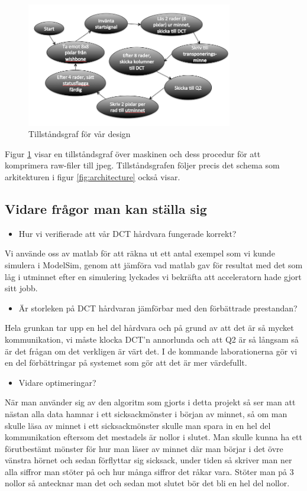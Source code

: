 \documentclass[a4paper]{article}
\begin{document}
\begin{figure}[h]
\centering
\includegraphics[width=340px]{states.png}
\caption{Tillståndsgraf för vår design}
\label{fig:state}
\end{figure}
Figur \ref{fig:state} visar en tillståndsgraf över maskinen och dess procedur för att komprimera raw-filer till jpeg. Tillståndsgrafen följer precis det schema som arkitekturen i figur \ref{fig:architecture} också visar.

\subsection{Vidare frågor man kan ställa sig}
\begin{itemize}
	\item Hur vi verifierade att vår DCT hårdvara fungerade korrekt?
\end{itemize}
Vi använde oss av matlab för att räkna ut ett antal exempel som vi kunde simulera i ModelSim, genom att jämföra vad matlab gav för resultat med det som låg i utminnet efter en simulering lyckades vi bekräfta att acceleratorn hade gjort sitt jobb.

\begin{itemize}
	\item Är storleken på DCT hårdvaran jämförbar med den förbättrade prestandan?
\end{itemize}
Hela grunkan tar upp en hel del hårdvara och på grund av att det är så mycket kommunikation, vi måste klocka DCT\rq{}n annorlunda och att Q2 är så långsam så är det frågan om det verkligen är värt det. I de kommande laborationerna gör vi en del förbättringar på systemet som gör att det är mer värdefullt.

\begin{itemize}
	\item Vidare optimeringar?
\end{itemize}
När man använder sig av den algoritm som gjorts i detta projekt så ser man att nästan alla data hamnar i ett sicksackmönster i början av minnet, så om man skulle läsa av minnet i ett sicksackmönster skulle man spara in en hel del kommunikation eftersom det mestadels är nollor i slutet. Man skulle kunna ha ett förutbestämt mönster för hur man läser av minnet där man börjar i det övre vänstra hörnet och sedan förflyttar sig sicksack, under tiden så skriver man ner alla siffror man stöter på och hur många siffror det råkar vara. Stöter man på 3 nollor så antecknar man det och sedan mot slutet bör det bli en hel del nollor. 
\end{document}
